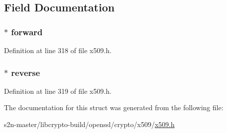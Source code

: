 \subsection{Field Documentation}
\subsubsection[{\texorpdfstring{forward}{forward}}]{ $\ast$ forward}\hypertarget{structx509__cert__pair__st_add83901690509d583e405c3f45ec0a0b}{}\label{structx509__cert__pair__st_add83901690509d583e405c3f45ec0a0b}


Definition at line 318 of file x509.\+h.

\subsubsection[{\texorpdfstring{reverse}{reverse}}]{ $\ast$ reverse}\hypertarget{structx509__cert__pair__st_a62c84d90f536d005bb08d1a1d439a180}{}\label{structx509__cert__pair__st_a62c84d90f536d005bb08d1a1d439a180}


Definition at line 319 of file x509.\+h.



The documentation for this struct was generated from the following file\+:\begin{DoxyCompactItemize}
\item 
s2n-\/master/libcrypto-\/build/openssl/crypto/x509/\hyperlink{crypto_2x509_2x509_8h}{x509.\+h}\end{DoxyCompactItemize}
